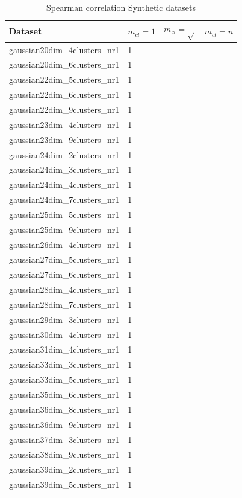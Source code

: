 \documentclass[11pt]{article}
\begin{document}
{\begin{table}[h!]
\footnotesize
\centering
\caption{Spearman correlation Synthetic datasets}
\label{tab:corSynt}
\begin{tabular}{llll}
\hline
Dataset     & $m_{cl} = 1$ & $m_{cl} = \sqrt{}$ & $m_{cl} = n$  \\ \hline
gaussian20dim\_4clusters\_nr1 &   1  & & \\ 
gaussian20dim\_6clusters\_nr1 &   1  & & \\ 
gaussian22dim\_5clusters\_nr1 &   1  & & \\ 
gaussian22dim\_6clusters\_nr1 &   1  & & \\ 
gaussian22dim\_9clusters\_nr1 &   1  & & \\ 
gaussian23dim\_4clusters\_nr1 &   1  & & \\ 
gaussian23dim\_9clusters\_nr1 &   1  & & \\ 
gaussian24dim\_2clusters\_nr1 &   1  & & \\ 
gaussian24dim\_3clusters\_nr1 &   1  & & \\ 
gaussian24dim\_4clusters\_nr1 &   1  & & \\ 
gaussian24dim\_7clusters\_nr1 &   1  & & \\ 
gaussian25dim\_5clusters\_nr1 &   1  & & \\ 
gaussian25dim\_9clusters\_nr1 &   1  & & \\ 
gaussian26dim\_4clusters\_nr1 &   1  & & \\ 
gaussian27dim\_5clusters\_nr1 &   1  & & \\ 
gaussian27dim\_6clusters\_nr1 &   1  & & \\ 
gaussian28dim\_4clusters\_nr1 &   1  & & \\ 
gaussian28dim\_7clusters\_nr1 &   1  & & \\ 
gaussian29dim\_3clusters\_nr1 &   1  & & \\ 
gaussian30dim\_4clusters\_nr1 &   1  & & \\ 
gaussian31dim\_4clusters\_nr1 &   1  & & \\ 
gaussian33dim\_3clusters\_nr1 &   1  & & \\ 
gaussian33dim\_5clusters\_nr1 &   1  & & \\ 
gaussian35dim\_6clusters\_nr1 &   1  & & \\ 
gaussian36dim\_8clusters\_nr1 &   1  & & \\ 
gaussian36dim\_9clusters\_nr1 &   1  & & \\ 
gaussian37dim\_3clusters\_nr1 &   1  & & \\ 
gaussian38dim\_9clusters\_nr1 &   1  & & \\ 
gaussian39dim\_2clusters\_nr1 &   1  & & \\ 
gaussian39dim\_5clusters\_nr1 &   1  & & \\ \bottomrule
\end{tabular}
\end{table}


}
\end{document}
